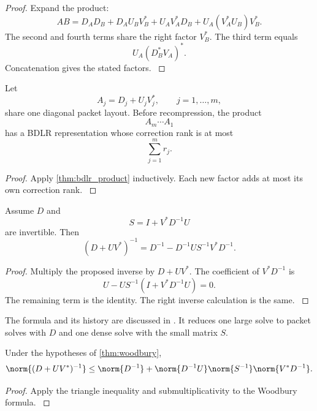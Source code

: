 \begin{proof}\label{main:proof:019}
Expand the product:
\[
AB
=
D_AD_B
+D_AU_BV_B^*
+U_AV_A^*D_B
+U_A(V_A^*U_B)V_B^*.
\]
The second and fourth terms share the right factor \(V_B^*\). The third term equals
\[
U_A(D_B^*V_A)^*.
\]
Concatenation gives the stated factors.
\label{main:proof:019:end}\end{proof}

\begin{corollary}\label{main:corollary:006}\label{cor:rank_growth}
Let
\[
A_j=D_j+U_jV_j^*,
\qquad
j=1,\ldots,m,
\]
share one diagonal packet layout. Before recompression, the product
\[
A_m\cdots A_1
\]
has a BDLR representation whose correction rank is at most
\[
\boxed{
\sum_{j=1}^m r_j.
}
\]
\end{corollary}

\begin{proof}\label{main:proof:020}
Apply \cref{thm:bdlr_product} inductively. Each new factor adds at most its own correction rank.
\label{main:proof:020:end}\end{proof}

\begin{theorem}\label{main:theorem:010}\label{thm:woodbury}
Assume \(D\) and
\[
S=I+V^*D^{-1}U
\]
are invertible. Then
\[
\boxed{
(D+UV^*)^{-1}
=
D^{-1}
-D^{-1}US^{-1}V^*D^{-1}.
}
\]
\end{theorem}

\begin{proof}\label{main:proof:021}
Multiply the proposed inverse by \(D+UV^*\). The coefficient of \(V^*D^{-1}\) is
\[
U-US^{-1}(I+V^*D^{-1}U)=0.
\]
The remaining term is the identity. The right inverse calculation is the same.
\label{main:proof:021:end}\end{proof}

The formula and its history are discussed in \cite{Hager1989}. It reduces one large solve to packet solves with \(D\) and one dense solve with the small matrix \(S\).

\begin{corollary}\label{main:corollary:007}\label{cor:inverse_norm}
Under the hypotheses of \cref{thm:woodbury},
\[
\norm{(D+UV^*)^{-1}}
\leq
\norm{D^{-1}}
+
\norm{D^{-1}U}
\norm{S^{-1}}
\norm{V^*D^{-1}}.
\]
\end{corollary}

\begin{proof}\label{main:proof:022}
Apply the triangle inequality and submultiplicativity to the Woodbury formula.
\label{main:proof:022:end}\end{proof}

